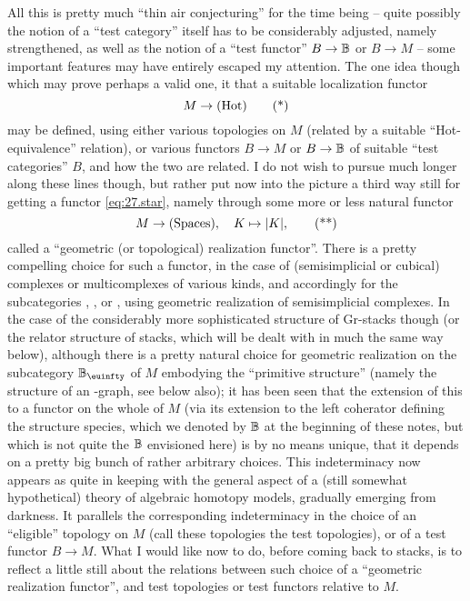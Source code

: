 \label{sec:27}%
All this is pretty much ``thin air conjecturing'' for the time being
-- quite possibly the notion of a ``test category'' itself has to be
considerably adjusted, namely strengthened, as well as the notion of a
``test functor'' $B \to {\ensuremath{\mathbb{B}}}$ or $B \to M$ -- some important features
may have entirely escaped my attention. The one idea though which may
prove perhaps a valid one, it that a suitable localization functor
\begin{equation}
  \label{eq:27.star}
  M \to {\ensuremath{(\mathrm{Hot})}} \tag{*}
\end{equation}
may be defined, using either various topologies on $M$ (related by a
suitable ``Hot-equivalence'' relation), or various functors $B \to M$
or $B \to {\ensuremath{\mathbb{B}}}$ of suitable ``test categories'' $B$, and how the two
are related. I do not wish to pursue much longer along these lines
though, but rather put now into the picture a third way still for
getting a functor \eqref{eq:27.star}, namely through some more or less
natural functor
\begin{equation}
  \label{eq:27.starstar}
  M \to {\ensuremath{(\mathrm{Spaces})}}, \quad K \mapsto \lvert K\rvert, \tag{**}
\end{equation}
called a ``geometric (or topological) realization functor''. There is
a pretty compelling choice for such a functor, in the case of
(semisimplicial or cubical) complexes or multicomplexes of various
kinds, and accordingly for the subcategories \Cat, \Preord, \Ord{} or
\Sssets, using geometric realization of semisimplicial complexes. In
the case of the considerably more sophisticated structure of Gr-stacks
though (or the relator structure of stacks, which will be dealt
with in much the same way below), although there is a pretty natural
choice for geometric realization on the subcategory $\bB_\oo$ of $M$
embodying the ``primitive structure'' (namely the structure of an
\oo-graph, see below also); it has been seen that the extension of
this to a functor on the whole of $M$ (via its extension to the left
coherator defining the structure species, which we denoted by ${\mathbb{B}}$ at
the beginning of these notes, but which is not quite the ${\mathbb{B}}$
envisioned here) is by no means unique, that it depends on a pretty
big bunch of rather arbitrary choices. This indeterminacy now appears
as quite in keeping with the general aspect of a (still somewhat
hypothetical) theory of algebraic homotopy models, gradually emerging
from darkness. It parallels the corresponding indeterminacy in the
choice of an ``eligible'' topology on $M$ (call these topologies the
test topologies), or of a test functor $B \to M$. What I would like
now to do, before coming back to stacks, is to reflect a little still
about the relations between such choice of a ``geometric realization
functor'', and test topologies or test functors relative to $M$.

